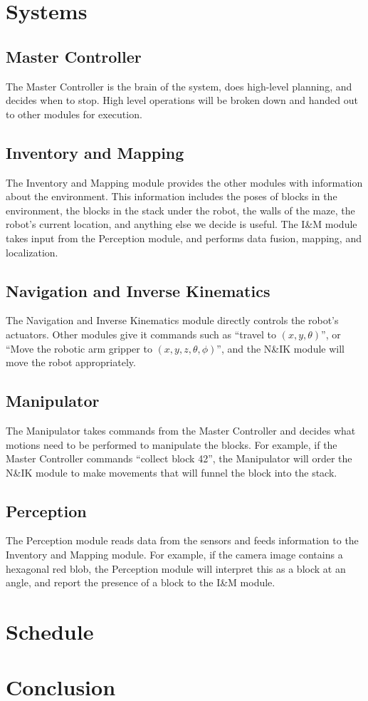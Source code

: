 \documentclass[letterpaper,12pt]{article}
\begin{document}
\section{Systems}

\subsection{Master Controller}
The Master Controller is the brain of the system, does high-level planning, and decides when to stop.
High level operations will be broken down and handed out to other modules for execution.

\subsection{Inventory and Mapping}
The Inventory and Mapping module provides the other modules with information about the environment.
This information includes the poses of blocks in the environment,
the blocks in the stack under the robot,
the walls of the maze,
the robot's current location,
and anything else we decide is useful.
The I\&M module takes input from the Perception module, and performs data fusion, mapping, and localization.

\subsection{Navigation and Inverse Kinematics}
The Navigation and Inverse Kinematics module directly controls the robot's actuators.
Other modules give it commands such as ``travel to $(x, y, \theta)$'',
or ``Move the robotic arm gripper to $(x, y, z, \theta, \phi)$'',
and the N\&IK module will move the robot appropriately.

\subsection{Manipulator}
The Manipulator takes commands from the Master Controller
and decides what motions need to be performed to manipulate the blocks.
For example, if the Master Controller commands ``collect block 42'',
the Manipulator will order the N\&IK module to make movements that will funnel the block into the stack.

\subsection{Perception}
The Perception module reads data from the sensors and feeds information to the Inventory and Mapping module.
For example, if the camera image contains a hexagonal red blob,
the Perception module will interpret this as a block at an angle,
and report the presence of a block to the I\&M module.

\section{Schedule}

\section{Conclusion}
\end{document}
